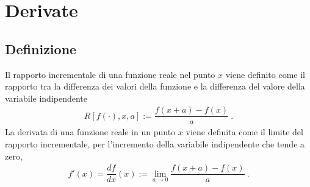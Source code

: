 \documentclass[letterpaper,10pt,italian]{jupyterBook}
\begin{document}
\sphinxstepscope


\chapter{Derivate}
\label{\detokenize{ch/infinitesimal_calculus/derivatives:derivate}}\label{\detokenize{ch/infinitesimal_calculus/derivatives:infinitesimal-calculus-derivatives}}\label{\detokenize{ch/infinitesimal_calculus/derivatives::doc}}

\section{Definizione}
\label{\detokenize{ch/infinitesimal_calculus/derivatives:definizione}}\label{\detokenize{ch/infinitesimal_calculus/derivatives:infinitesimal-calculus-derivatives-def}}
\sphinxAtStartPar
{} Il rapporto incrementale di una funzione reale nel punto \(x\) viene definito come il rapporto tra la differenza dei valori della funzione e la differenza del valore della variabile indipendente
\begin{equation}\label{equation:ch/infinitesimal_calculus/derivatives:eq:infinitesimal-calculus:derivatives:def_delta}
\begin{split}R[f(\cdot), x, a] := \dfrac{f(x+a)-f(x)}{a} \ .\end{split}
\end{equation}
\sphinxAtStartPar
{} La derivata di una funzione reale in un punto \(x\) viene definita come il limite del rapporto incrementale, per l’incremento della variabile indipendente che tende a zero,
\begin{equation}\label{equation:ch/infinitesimal_calculus/derivatives:eq:infinitesimal-calculus:derivatives:def}
\begin{split}f'(x) = \dfrac{d f}{d x}(x) := \lim_{a \rightarrow 0} \dfrac{f(x+a)-f(x)}{a} \ .\end{split}
\end{equation}
\sphinxAtStartPar
{} 
\end{document}
